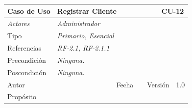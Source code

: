 \begin{table}[H]
    \begin{tabular}{|llllllll|}
    \hline
    \multicolumn{1}{|l|}{\cellcolor[HTML]{F2F2F2}Caso de Uso}           & \multicolumn{5}{l|}{Registrar Cliente}                                                                       & \multicolumn{2}{l|}{\cellcolor[HTML]{E6E6E6}CU-12}             \\ \hline
    \multicolumn{1}{|l|}{{\color[HTML]{808080} \textit{Actores}}}       & \multicolumn{7}{l|}{{\color[HTML]{808080} \textit{Administrador}}}                                                                                                      \\ \hline
    \multicolumn{1}{|l|}{Tipo}                                          & \multicolumn{7}{l|}{{\color[HTML]{808080} \textit{Primario, Esencial}}}                                                                                                                           \\ \hline
    \multicolumn{1}{|l|}{Referencias}                                   & \multicolumn{2}{l|}{{\color[HTML]{808080} \textit{RF-2.1, RF-2.1.1}}}                & \multicolumn{5}{l|}{}                                                                                                \\ \hline
    \multicolumn{1}{|l|}{Precondici\'on}                                  & \multicolumn{7}{l|}{{\color[HTML]{808080} \textit{Ninguna.}}}                                                                                                      \\ \hline
    \multicolumn{1}{|l|}{Poscondici\'on}                                  & \multicolumn{7}{l|}{{\color[HTML]{808080} \textit{Ninguna.}}}                                                                                                                                                                             \\ \hline
    \multicolumn{1}{|l|}{Autor}                                         & \multicolumn{1}{l|}{}                         & \multicolumn{2}{l|}{Fecha}             & \multicolumn{1}{l|}{}        & \multicolumn{2}{l|}{Versi\'on}             & 1.0                            \\ \hline
    \multicolumn{8}{|l|}{Prop\'osito}                                                                                                                                                                                                                                         \\ \hline

\end{tabular}
\end{table}
